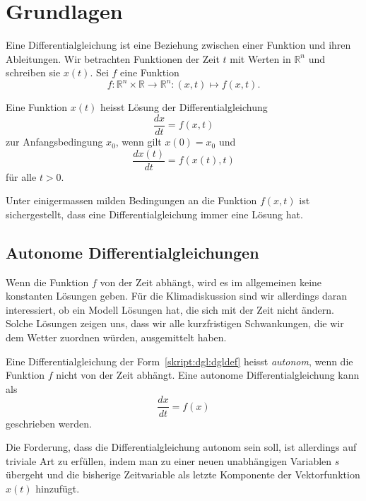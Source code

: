 %
%
%
\section{Grundlagen}
Eine Differentialgleichung ist eine Beziehung zwischen einer Funktion und
ihren Ableitungen.
Wir betrachten Funktionen der Zeit $t$ mit Werten in $\mathbb R^n$
und schreiben sie $x(t)$.
Sei $f$ eine Funktion
\[
f\colon \mathbb R^n\times \mathbb R \to \mathbb R^n: (x,t) \mapsto f(x,t).
\]

\begin{definition}
Eine Funktion $x(t)$ heisst Lösung der Differentialgleichung
\begin{equation}
\frac{dx}{dt} = f(x,t)
\label{skript:dgl:dgldef}
\end{equation}
zur Anfangsbedingung $x_0$, wenn gilt $x(0)=x_0$ und
\[
\frac{dx(t)}{dt} = f(x(t),t)
\]
für alle $t>0$.
\end{definition}

Unter einigermassen milden Bedingungen an die Funktion $f(x,t)$ ist
sichergestellt, dass eine Differentialgleichung immer eine Lösung hat.

\subsection{Autonome Differentialgleichungen}
Wenn die Funktion $f$ von der Zeit abhängt, wird es im allgemeinen
keine konstanten Lösungen geben.
Für die Klimadiskussion sind wir allerdings daran interessiert, ob
ein Modell Lösungen hat, die sich mit der Zeit nicht ändern.
Solche Lösungen zeigen uns, dass wir alle kurzfristigen
Schwankungen, die wir dem Wetter zuordnen würden, ausgemittelt haben.

\begin{definition}
Eine Differentialgleichung der Form~\eqref{skript:dgl:dgldef}
heisst {\em autonom},
%
wenn die Funktion $f$ nicht von der Zeit abhängt.
Eine autonome Differentialgleichung kann als
\[
\frac{dx}{dt} = f(x)
\]
geschrieben werden.
\end{definition}

Die Forderung, dass die Differentialgleichung autonom sein soll, ist
allerdings auf triviale Art zu erfüllen, indem man zu einer neuen
unabhängigen Variablen $s$ übergeht und die bisherige Zeitvariable 
als letzte Komponente der Vektorfunktion $x(t)$ hinzufügt.

